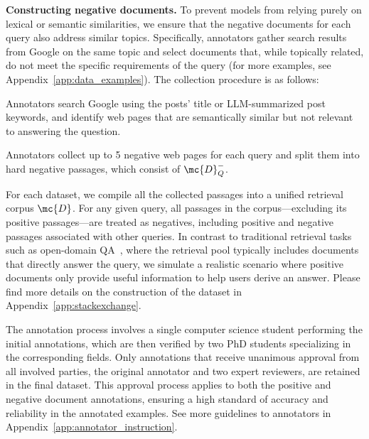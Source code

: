 \textbf{Constructing negative documents.} 
To prevent models from relying purely on lexical or semantic similarities, we ensure that the negative documents for each query also address similar topics. Specifically, annotators gather search results from Google on the same topic and select documents that, while topically related, do not meet the specific requirements of the query (for more examples, see Appendix~\ref{app:data_examples}). The collection procedure is as follows:
\vspace{-8pt}
\begin{steps}[itemsep=0mm]
  \item Annotators search Google using the posts' title or LLM-summarized post keywords, and identify web pages that are semantically similar but not relevant to answering the question. 
  \item Annotators collect up to 5 negative web pages for each query and split them into hard negative passages, which consist of $\mc{D}^{-}_Q$.
\end{steps}

For each dataset, we compile all the collected passages into a unified retrieval corpus $\mc{D}$. For any given query, all passages in the corpus—excluding its positive passages—are treated as negatives, including positive and negative passages associated with other queries. In contrast to traditional retrieval tasks such as open-domain QA~\citep{fan2019eli5, kwiatkowski2019natural}, where the retrieval pool typically includes documents that directly answer the query, we simulate a realistic scenario where positive documents only provide useful information to help users derive an answer. Please find more details on the construction of the dataset in Appendix~\ref{app:stackexchange}.

The annotation process involves a single computer science student performing the initial annotations, which are then verified by two PhD students specializing in the corresponding fields. Only annotations that receive unanimous approval from all involved parties, the original annotator and two expert reviewers, are retained in the final dataset. 
This approval process applies to both the positive and negative document annotations, ensuring a high standard of accuracy and reliability in the annotated examples.
See more guidelines to annotators in Appendix~\ref{app:annotator_instruction}.




